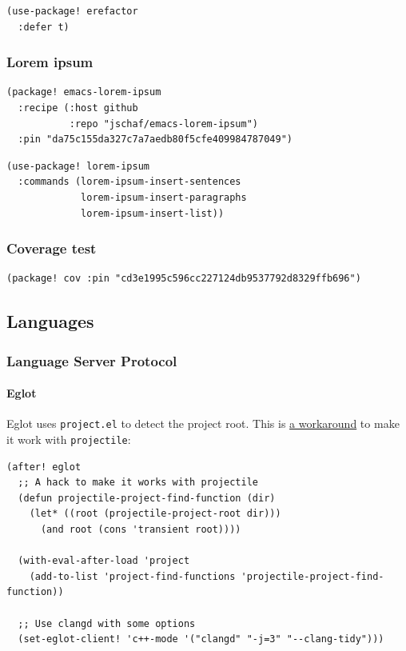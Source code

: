 \documentclass[11pt]{article}
\begin{document}
\begin{verbatim}
(use-package! erefactor
  :defer t)
\end{verbatim}

\subsubsection{Lorem ipsum}
\label{sec:org7692d26}

\begin{verbatim}
(package! emacs-lorem-ipsum
  :recipe (:host github
           :repo "jschaf/emacs-lorem-ipsum")
  :pin "da75c155da327c7a7aedb80f5cfe409984787049")
\end{verbatim}

\begin{verbatim}
(use-package! lorem-ipsum
  :commands (lorem-ipsum-insert-sentences
             lorem-ipsum-insert-paragraphs
             lorem-ipsum-insert-list))
\end{verbatim}

\subsubsection{Coverage test}
\label{sec:orgb510d7f}

\begin{verbatim}
(package! cov :pin "cd3e1995c596cc227124db9537792d8329ffb696")
\end{verbatim}

\subsection{Languages}
\label{sec:org593ba14}
\subsubsection{Language Server Protocol}
\label{sec:orga1d2a3c}
\paragraph{Eglot}
\label{sec:orgda49417}
Eglot uses \texttt{project.el} to detect the project root. This is \href{https://github.com/joaotavora/eglot/issues/129\#issuecomment-444130367}{a workaround} to make
it work with \texttt{projectile}:

\begin{verbatim}
(after! eglot
  ;; A hack to make it works with projectile
  (defun projectile-project-find-function (dir)
    (let* ((root (projectile-project-root dir)))
      (and root (cons 'transient root))))

  (with-eval-after-load 'project
    (add-to-list 'project-find-functions 'projectile-project-find-function))

  ;; Use clangd with some options
  (set-eglot-client! 'c++-mode '("clangd" "-j=3" "--clang-tidy")))
\end{verbatim}
\end{document}
